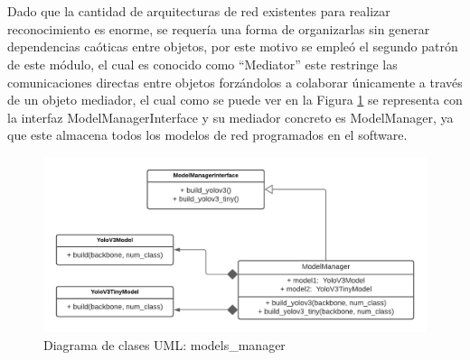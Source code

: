 \\
\\ 
Dado que la cantidad de arquitecturas de red existentes para realizar reconocimiento es enorme, se requería una forma de organizarlas sin generar dependencias caóticas entre objetos, por este motivo se empleó el segundo patrón de este módulo, el cual es conocido como ``Mediator'' este restringe las comunicaciones directas entre objetos forzándolos a colaborar únicamente a través de un objeto mediador, el cual como se puede ver en la Figura \ref{models_manager_uml} se representa con la interfaz ModelManagerInterface y su mediador concreto es ModelManager, ya que este almacena todos los modelos de red programados en el software.
\begin{figure}[H]
    \centering
    \includegraphics[scale=0.5]{Recursos/Model_Manager_uml.png}
    \caption{Diagrama de clases UML: models\_manager}
    \label{models_manager_uml}
\end{figure}
